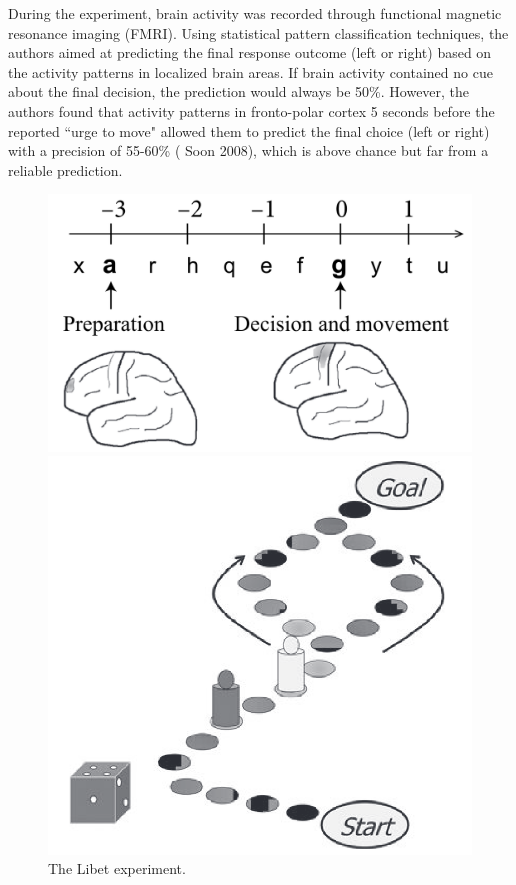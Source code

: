 \documentclass[12pt,hyperref,a4paper,UTF8]{ctexart}
\begin{document}
During the experiment, brain activity was recorded through functional magnetic resonance imaging (FMRI). Using statistical pattern classification techniques, the authors aimed at predicting the final response outcome (left or right) based on the activity patterns in localized brain areas. If brain activity contained no cue about the final decision, the prediction would always be 50\%. However, the authors found that activity patterns in fronto-polar cortex 5 seconds before the reported ``urge to move" allowed them to predict the final choice (left or right) with a precision of 55-60\% (\cite{Soon 2008} Soon 2008), which is above chance but far from a reliable prediction.

\begin{figure}[h]  
    \centering  
    \begin{minipage}{0.45\textwidth} 
        \centering  
        \includegraphics[width=\textwidth]{game1.png} 
        \caption{The Libet experiment.}
        \label{game1}  
    \end{minipage}  
    \hspace{0.1\textwidth}
    \begin{minipage}{0.3\textwidth} 
        \centering  
        \includegraphics[width=\textwidth]{game2.png} 

\end{minipage}
\end{figure}
\end{document}
